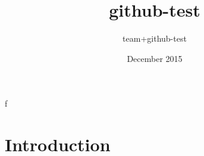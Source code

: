 \documentclass{article}
\title{github-test}
\author{team+github-test }
\date{December 2015}
\begin{document}
\maketitle

f


\section{Introduction}
\end{document}
